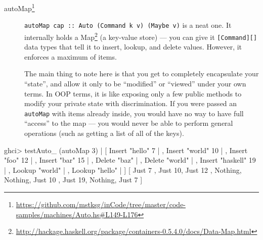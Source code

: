 \documentclass[]{article}
\newenvironment{Shaded}{}{}
\newcommand{\DataTypeTok}[1]{\textcolor[rgb]{0.56,0.13,0.00}{#1}}
\newcommand{\DecValTok}[1]{\textcolor[rgb]{0.25,0.63,0.44}{#1}}
\newcommand{\FunctionTok}[1]{\textcolor[rgb]{0.02,0.16,0.49}{#1}}
\newcommand{\NormalTok}[1]{#1}
\newcommand{\StringTok}[1]{\textcolor[rgb]{0.25,0.44,0.63}{#1}}
\renewcommand{\href}[2]{#2\footnote{\url{#1}}}
\begin{document}
\begin{description}
\item[\href{https://github.com/mstksg/inCode/tree/master/code-samples/machines/Auto.hs\#L149-L176}{autoMap}]
\texttt{autoMap\ cap\ ::\ Auto\ (Command\ k\ v)\ (Maybe\ v)} is a neat one. It
internally holds a
\href{http://hackage.haskell.org/package/containers-0.5.4.0/docs/Data-Map.html}{Map}
(a key-value store) --- you can give it \texttt{{[}Command{]}{[}{]}} data types
that tell it to insert, lookup, and delete values. However, it enforces a
maximum of items.

The main thing to note here is that you get to completely encapsulate your
``state'', and allow it only to be ``modified'' or ``viewed'' under your own
terms. In OOP terms, it is like exposing only a few public methods to modify
your private state with discrimination. If you were passed an \texttt{autoMap}
with items already inside, you would have no way to have full ``access'' to the
map --- you would never be able to perform general operations (such as getting a
list of all of the keys).
\end{description}

\begin{Shaded}
\begin{Highlighting}[]
\NormalTok{ghci}\FunctionTok{>}\NormalTok{ testAuto_ (autoMap }\DecValTok{3}\NormalTok{)}
    \FunctionTok{|}\NormalTok{   [ }\DataTypeTok{Insert} \StringTok{"hello"} \DecValTok{7}
    \FunctionTok{|}\NormalTok{   , }\DataTypeTok{Insert} \StringTok{"world"} \DecValTok{10}
    \FunctionTok{|}\NormalTok{   , }\DataTypeTok{Insert} \StringTok{"foo"} \DecValTok{12}
    \FunctionTok{|}\NormalTok{   , }\DataTypeTok{Insert} \StringTok{"bar"} \DecValTok{15}
    \FunctionTok{|}\NormalTok{   , }\DataTypeTok{Delete} \StringTok{"baz"}
    \FunctionTok{|}\NormalTok{   , }\DataTypeTok{Delete} \StringTok{"world"}
    \FunctionTok{|}\NormalTok{   , }\DataTypeTok{Insert} \StringTok{"haskell"} \DecValTok{19}
    \FunctionTok{|}\NormalTok{   , }\DataTypeTok{Lookup} \StringTok{"world"}
    \FunctionTok{|}\NormalTok{   , }\DataTypeTok{Lookup} \StringTok{"hello"}
    \FunctionTok{|}\NormalTok{   ]}
\NormalTok{[ }\DataTypeTok{Just} \DecValTok{7}\NormalTok{ , }\DataTypeTok{Just} \DecValTok{10}\NormalTok{, }\DataTypeTok{Just} \DecValTok{12}
\NormalTok{, }\DataTypeTok{Nothing}\NormalTok{, }\DataTypeTok{Nothing}\NormalTok{, }\DataTypeTok{Just} \DecValTok{10}
\NormalTok{, }\DataTypeTok{Just} \DecValTok{19}\NormalTok{, }\DataTypeTok{Nothing}\NormalTok{, }\DataTypeTok{Just} \DecValTok{7}\NormalTok{  ]}
\end{Highlighting}
\end{Shaded}
\end{document}
